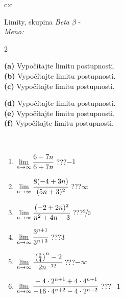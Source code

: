 \documentclass[10pt]{report}
\begin{document}
\newpage
\thispagestyle{empty}
\begin{tabular}{c:c}
\begin{minipage}[c][104.5mm][t]{0.5\linewidth}
\begin{center}
\vspace{5mm}
{\huge Limity, skupina \textit{Beta $\beta$} -}\\[5mm]
\textit{Meno:}\phantom{xxxxxxxxxxxxxxxxxxxxxxxxxxxxxxxxxxxxxxxxxxxxxxxxxxxxxxxxxxxxxxxxx}\\[5mm]
\begin{minipage}{0.95\linewidth}
\begin{center}
{\small \begin{multicols}{2} \raggedright
\textbf{(a)} Vypočítajte limitu postupnosti. \\[1mm]
\textbf{(b)} Vypočítajte limitu postupnosti. \\[1mm]
\textbf{(c)} Vypočítajte limitu postupnosti. \par \columnbreak
\textbf{(d)} Vypočítajte limitu postupnosti. \\[1mm]
\textbf{(e)} Vypočítajte limitu postupnosti. \\[1mm]
\textbf{(f)} Vypočítajte limitu postupnosti.
\end{multicols}
}
\end{center}
\end{minipage}
\\[1mm]
\begin{minipage}{0.79\linewidth}
\begin{center}
\begin{varwidth}{\linewidth}
\setlength{\itemsep}{0pt}
\begin{enumerate}
\footnotesizerr
\item $\lim\limits_{n\to\infty}\cfrac{6-7n}{6+7n}$\quad \dotfill\; ???\;\dotfill \quad $-1$
\item $\lim\limits_{n\to\infty}\cfrac{8(-4+3n)}{(5n+3)^2}$\quad \dotfill\; ???\;\dotfill \quad $\infty$
\item $\lim\limits_{n\to\infty}\cfrac{(-2+2n)^2}{n^2+4n-3}$\quad \dotfill\; ???\;\dotfill \quad $\nicefrac{2}{3}$
\item $\lim\limits_{n\to\infty}\cfrac{3^{n+1}}{3^{n+3}}$\quad \dotfill\; ???\;\dotfill \quad $3$
\item $\lim\limits_{n\to\infty}\cfrac{\left(\frac{2}{4}\right)^n -2}{2n^{-12}}$\quad \dotfill\; ???\;\dotfill \quad $-\infty$
\item $\lim\limits_{n\to\infty}\cfrac{-4\cdot 2^{n+1}+4\cdot 4^{n+1}}{-16\cdot 4^{n+2}-4\cdot 2^{n-2}}$\quad \dotfill\; ???\;\dotfill \quad $-1$

\end{enumerate}
\end{varwidth}
\end{center}
\end{minipage}
\end{center}
\end{minipage}
\end{tabular}
\end{document}
